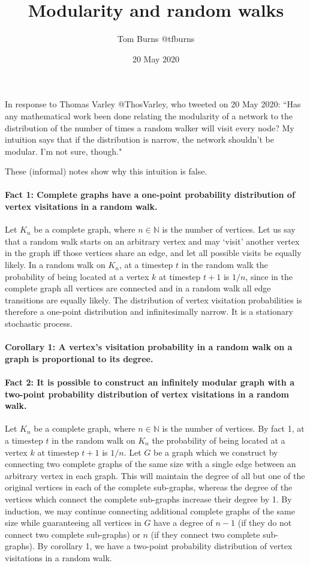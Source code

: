 \documentclass{article}
\title{Modularity and random walks}
\author{Tom Burns @tfburns}
\date{20 May 2020}
\begin{document}
\maketitle

In response to Thomas Varley @ThosVarley, who tweeted on 20 May 2020: ``Has any mathematical work been done relating the modularity of a network to the distribution of the number of times a random walker will visit every node?  My intuition says that if the distribution is narrow, the network shouldn't be modular. I'm not sure, though."

These (informal) notes show why this intuition is false.

\paragraph{Fact 1: Complete graphs have a one-point probability distribution of vertex visitations in a random walk.}
Let $K_n$ be a complete graph, where $n \in \mathbb{N}$ is the number of vertices. Let us say that a random walk starts on an arbitrary vertex and may `visit' another vertex in the graph iff those vertices share an edge, and let all possible visits be equally likely. In a random walk on $K_n$, at a timestep $t$ in the random walk the probability of being located at a vertex $k$ at timestep $t+1$ is $1/n$, since in the complete graph all vertices are connected and in a random walk all edge transitions are equally likely. The distribution of vertex visitation probabilities is therefore a one-point distribution and infinitesimally narrow. It is a stationary stochastic process.

\paragraph{Corollary 1: A vertex's visitation probability in a random walk on a graph is proportional to its degree.}

\paragraph{Fact 2: It is possible to construct an infinitely modular graph with a two-point probability distribution of vertex visitations in a random walk.}

Let $K_n$ be a complete graph, where $n \in \mathbb{N}$ is the number of vertices. By fact 1, at a timestep $t$ in the random walk on $K_n$ the probability of being located at a vertex $k$ at timestep $t+1$ is $1/n$. Let $G$ be a graph which we construct by connecting two complete graphs of the same size with a single edge between an arbitrary vertex in each graph. This will maintain the degree of all but one of the original vertices in each of the complete sub-graphs, whereas the degree of the vertices which connect the complete sub-graphs increase their degree by 1. By induction, we may continue connecting additional complete graphs of the same size while guaranteeing all vertices in $G$ have a degree of $n-1$ (if they do not connect two complete sub-graphs) or $n$ (if they connect two complete sub-graphs). By corollary 1, we have a two-point probability distribution of vertex visitations in a random walk.
\end{document}
